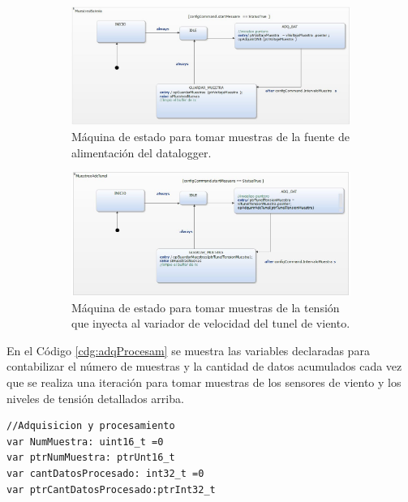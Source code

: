 \begin{figure}[H]
    \centering
    \begin{subfigure}[b]{0.9\textwidth}
        \centering
        \includegraphics[width=\linewidth]{Figuras/datalogger/Firmware/muestreBat.jpg}
        \caption{Máquina de estado para tomar muestras de la fuente de alimentación del datalogger.}
        \label{fig:muestreBat}
    \end{subfigure}\hspace{0.09\textwidth}
    \begin{subfigure}[b]{0.9\textwidth}
        \centering
        \includegraphics[width=\linewidth]{Figuras/datalogger/Firmware/muestreAdc.jpg}
        \caption{Máquina de estado para tomar muestras de la tensión que inyecta al variador de velocidad del tunel de viento.}
        \label{fig:muestreAdc}
    \end{subfigure}
    \caption{}
    \label{fig:mainFigure}
\end{figure}

En el Código \ref{cdg:adqProcesam} se muestra las variables declaradas para contabilizar el número de muestras y la cantidad de datos acumulados cada vez que se realiza una iteración para tomar muestras de los sensores de viento y los niveles de tensión detallados arriba. 


\begin{lstlisting}[style=yakindustyle, caption={Varibles para controlar la adquisición y procesamiento de los datos .}, label=cdg:adqProcesam]
//Adquisicion y procesamiento
var NumMuestra: uint16_t =0
var ptrNumMuestra: ptrUnt16_t
var cantDatosProcesado: int32_t =0
var ptrCantDatosProcesado:ptrInt32_t
\end{lstlisting}

